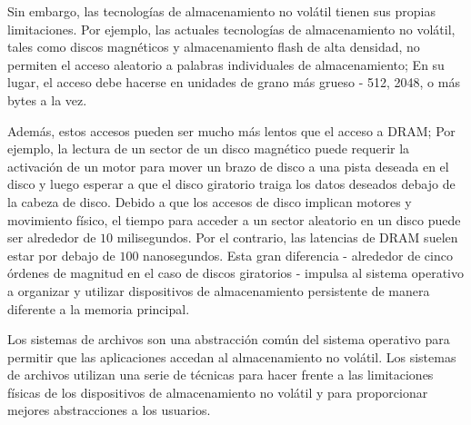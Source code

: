 \documentclass[10pt]{book}
\begin{document}
Sin embargo, las tecnologías de almacenamiento no volátil tienen sus propias limitaciones. Por ejemplo, las actuales tecnologías de almacenamiento no volátil, tales como discos magnéticos y almacenamiento flash de alta densidad, no permiten el acceso aleatorio a palabras individuales de almacenamiento; En su lugar, el acceso debe hacerse en unidades de grano más grueso - 512, 2048, o más bytes a la vez.

Además, estos accesos pueden ser mucho más lentos que el acceso a DRAM; Por ejemplo, la lectura de un sector de un disco magnético puede requerir la activación de un motor para mover un brazo de disco a una pista deseada en el disco y luego esperar a que el disco giratorio traiga los datos deseados debajo de la cabeza de disco. Debido a que los accesos de disco implican motores y movimiento físico, el tiempo para acceder a un sector aleatorio en un disco puede ser alrededor de $10$ milisegundos. Por el contrario, las latencias de DRAM suelen estar por debajo de $100$ nanosegundos. Esta gran diferencia - alrededor de cinco órdenes de magnitud en el caso de discos giratorios - impulsa al sistema operativo a organizar y utilizar dispositivos de almacenamiento persistente de manera diferente a la memoria principal.

Los sistemas de archivos son una abstracción común del sistema operativo para permitir que las aplicaciones accedan al almacenamiento no volátil. Los sistemas de archivos utilizan una serie de técnicas para hacer frente a las limitaciones físicas de los dispositivos de almacenamiento no volátil y para proporcionar mejores abstracciones a los usuarios.
\end{document}
